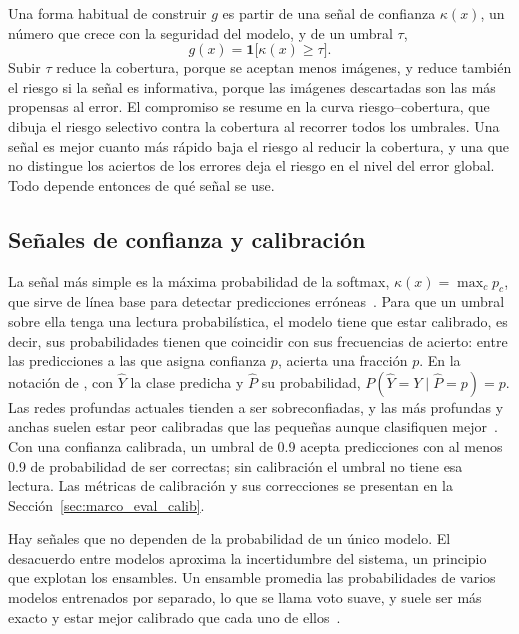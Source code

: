 Una forma habitual de construir $g$ es partir de una señal de confianza $\kappa(x)$, un número que crece con la
seguridad del modelo, y de un umbral $\tau$,
\begin{equation}
    g(x) = \mathbf{1}\bigl[\kappa(x) \ge \tau\bigr].
    \label{eq:marco_umbral_confianza}
\end{equation}
Subir $\tau$ reduce la cobertura, porque se aceptan menos imágenes, y reduce también el riesgo si la señal es
informativa, porque las imágenes descartadas son las más propensas al error. El compromiso se resume en la
curva riesgo--cobertura, que dibuja el riesgo selectivo contra la cobertura al recorrer todos los umbrales.
Una señal es mejor cuanto más rápido baja el riesgo al reducir la cobertura, y una que no distingue los
aciertos de los errores deja el riesgo en el nivel del error global. Todo depende entonces de qué señal se use.

\subsection{Señales de confianza y calibración}
\label{sec:marco_senales_confianza}

La señal más simple es la máxima probabilidad de la softmax, $\kappa(x) = \max_c p_c$, que sirve de línea
base para detectar predicciones erróneas~\cite{hendrycks2017baseline}. Para que un umbral sobre ella tenga una
lectura probabilística, el modelo tiene que estar calibrado, es decir, sus probabilidades tienen que coincidir con sus frecuencias de acierto: entre las
predicciones a las que asigna confianza $p$, acierta una fracción $p$. En la notación de
\textcite{guo2017calibration}, con $\hat{Y}$ la clase predicha y $\hat{P}$ su probabilidad,
$P(\hat{Y} = Y \mid \hat{P} = p) = p$. Las redes profundas actuales tienden a ser sobreconfiadas, y las más
profundas y anchas suelen estar peor calibradas que las pequeñas aunque clasifiquen
mejor~\cite{guo2017calibration}. Con una confianza calibrada, un umbral de 0.9 acepta predicciones con al
menos 0.9 de probabilidad de ser correctas; sin calibración el umbral no tiene esa lectura. Las métricas de
calibración y sus correcciones se presentan en la Sección~\ref{sec:marco_eval_calib}.

Hay señales que no dependen de la probabilidad de un único modelo. El desacuerdo entre modelos aproxima la
incertidumbre del sistema, un principio que explotan los ensambles. Un ensamble promedia las probabilidades de
varios modelos entrenados por separado, lo que se llama voto suave, y suele ser más exacto y estar mejor
calibrado que cada uno de ellos~\cite{lakshminarayanan2017simple}.

